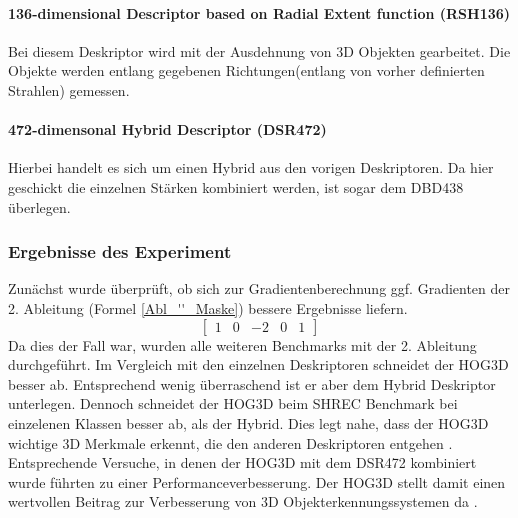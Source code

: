 \paragraph{136-dimensional Descriptor based on Radial Extent function (RSH136) }
Bei diesem Deskriptor wird mit der Ausdehnung von 3D Objekten gearbeitet. Die Objekte werden entlang gegebenen Richtungen(entlang von vorher definierten Strahlen) gemessen.

\paragraph{472-dimensonal Hybrid Descriptor (DSR472) }
Hierbei handelt es sich um einen Hybrid aus den vorigen Deskriptoren. Da hier geschickt die einzelnen Stärken kombiniert werden, ist sogar dem DBD438 überlegen.

\subsubsection{Ergebnisse des Experiment}
Zunächst wurde überprüft, ob sich zur Gradientenberechnung ggf. Gradienten der 2. Ableitung (Formel \ref{Abl_''_Maske}) bessere Ergebnisse liefern.    
\begin{equation}
\label{Abl_''_Maske}
\begin{bmatrix}
1 & 0 & -2 & 0 & 1
\end{bmatrix}
\end{equation}
Da dies der Fall war, wurden alle weiteren Benchmarks mit der 2. Ableitung durchgeführt. Im Vergleich mit den einzelnen Deskriptoren schneidet der HOG3D besser ab. Entsprechend wenig überraschend ist er aber dem Hybrid Deskriptor unterlegen. Dennoch schneidet der HOG3D beim SHREC Benchmark bei einzelenen Klassen besser ab, als der Hybrid. Dies legt nahe, dass der HOG3D wichtige 3D Merkmale erkennt, die den anderen Deskriptoren entgehen \cite{scherer2010histograms}.
\newline
Entsprechende Versuche, in denen der HOG3D mit dem DSR472 kombiniert wurde führten zu einer Performanceverbesserung. Der HOG3D stellt damit einen wertvollen Beitrag zur Verbesserung von 3D Objekterkennungssystemen da \cite{scherer2010histograms}.

